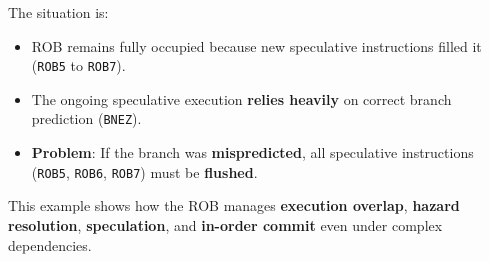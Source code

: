 \begin{examplebox}
\begin{itemize}
\begin{center}
\begin{adjustbox}{width={.92\textwidth},totalheight={\textheight},keepaspectratio}
            \end{adjustbox}
        \end{center}
        The situation is:
        \begin{itemize}
            \item ROB remains fully occupied because new speculative instructions filled it (\texttt{ROB5} to \texttt{ROB7}).
            \item The ongoing speculative execution \textbf{relies heavily} on correct branch prediction (\texttt{BNEZ}).
            \item \textbf{Problem}: If the branch was \textbf{mispredicted}, all speculative instructions (\texttt{ROB5}, \texttt{ROB6}, \texttt{ROB7}) must be \textbf{flushed}.
        \end{itemize}
    \end{itemize}
    This example shows how the ROB manages \textbf{execution overlap}, \textbf{hazard resolution}, \textbf{speculation}, and \textbf{in-order commit} even under complex dependencies.
\end{examplebox}